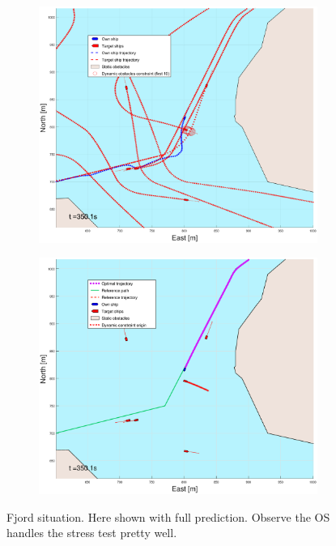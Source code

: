 \begin{figure}[ht!]
\begin{subfigure}[b]{0.499\textwidth}
    \end{subfigure}
    \hfill
    \\
    \begin{subfigure}[b]{0.49\textwidth}
        \centering
        \includegraphics[width=\textwidth]{Images/Figures/Trheimfjord/_Simple_0fig1_time=350}
    \end{subfigure}
    \hfill
    \begin{subfigure}[b]{0.499\textwidth}
        \centering
        \includegraphics[width=\textwidth]{Images/Figures/Trheimfjord/_Simple_0fig999_time=350}
    \end{subfigure}
    \hfill
    \caption{Fjord situation. Here shown with full prediction. Observe the \gls{OS} handles the stress test pretty well.}
    \label{FIG: Fjord with prediction}
\end{figure}


